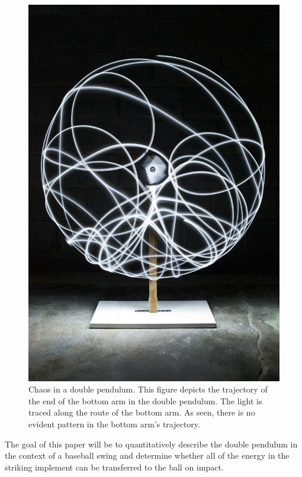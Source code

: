 \documentclass[%
 aip,
 amsmath,amssymb,
 reprint,%
 floatfix,%
]{revtex4-1}
\begin{document}
\begin{figure}
	\centering
	\includegraphics[scale=0.25]{lights.jpg}
	\caption{Chaos in a double pendulum. This figure depicts the trajectory of the end of the bottom arm in the double pendulum. The light is traced along the route of the bottom arm. As seen, there is no evident pattern in the bottom arm's trajectory.}
\end{figure}

\indent The goal of this paper will be to quantitatively describe the double pendulum in the context of a baseball swing and determine whether all of the energy in the striking implement can be transferred to the ball on impact.
\end{document}
